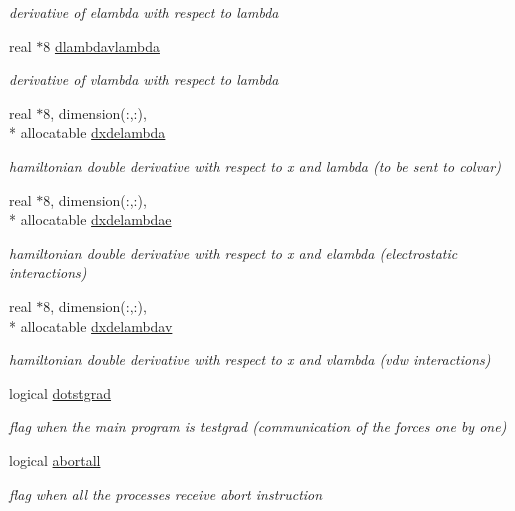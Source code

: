 \begin{DoxyCompactItemize}
\begin{DoxyCompactList}\small\item\em derivative of elambda with respect to lambda \end{DoxyCompactList}\item 
real $\ast$8 \hyperlink{classderiv_a8a01f4e537a4ec3b2fb825517bfccf42}{dlambdavlambda}
\begin{DoxyCompactList}\small\item\em derivative of vlambda with respect to lambda \end{DoxyCompactList}\item 
real $\ast$8, dimension(\-:,\-:), \\*
allocatable \hyperlink{classderiv_a61835c05c9b422286679e70d540c6f4a}{dxdelambda}
\begin{DoxyCompactList}\small\item\em hamiltonian double derivative with respect to x and lambda (to be sent to colvar) \end{DoxyCompactList}\item 
real $\ast$8, dimension(\-:,\-:), \\*
allocatable \hyperlink{classderiv_a3205c0909e4a054b12d6b5f2366e182e}{dxdelambdae}
\begin{DoxyCompactList}\small\item\em hamiltonian double derivative with respect to x and elambda (electrostatic interactions) \end{DoxyCompactList}\item 
real $\ast$8, dimension(\-:,\-:), \\*
allocatable \hyperlink{classderiv_a883c736eaa7d19c7c1cf277d532660b7}{dxdelambdav}
\begin{DoxyCompactList}\small\item\em hamiltonian double derivative with respect to x and vlambda (vdw interactions) \end{DoxyCompactList}\item 
logical \hyperlink{classderiv_af350f0fc69097554ec61246320c44a11}{dotstgrad}
\begin{DoxyCompactList}\small\item\em flag when the main program is testgrad (communication of the forces one by one) \end{DoxyCompactList}\item 
logical \hyperlink{classderiv_a9e661c0d552c41a0f149cdfd42ba923f}{abortall}
\begin{DoxyCompactList}\small\item\em flag when all the processes receive abort instruction \end{DoxyCompactList}\item 

\end{DoxyCompactItemize}
